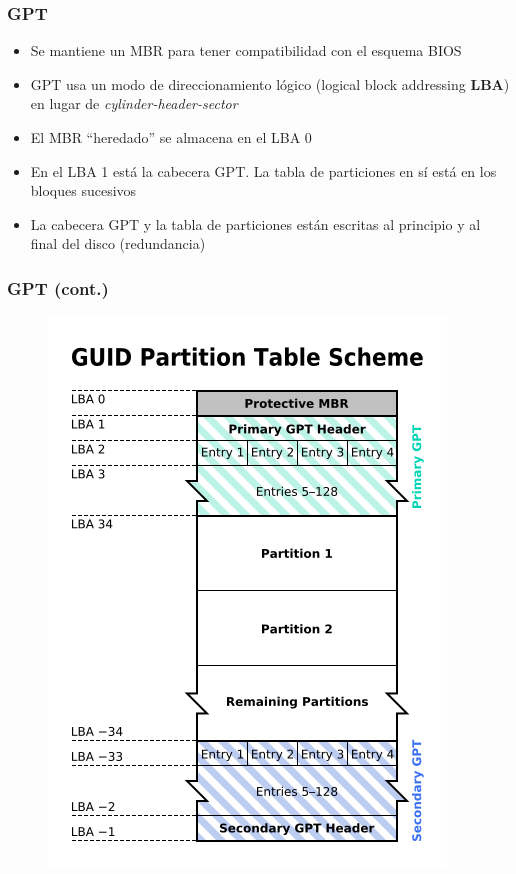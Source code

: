 \begin{frame}
	\frametitle{GPT}
	\begin{itemize}
		\item Se mantiene un MBR para tener compatibilidad con el esquema BIOS
		\item GPT usa un modo de direccionamiento lógico (logical block addressing \textbf{LBA}) en lugar de \textit{cylinder-header-sector}
		\item El MBR ``heredado'' se almacena en el LBA 0
		\item En el LBA 1 está la cabecera GPT. La tabla de particiones en sí está en los bloques sucesivos
		\item La cabecera GPT y la tabla de particiones están escritas al principio y al final del disco (redundancia)
	\end{itemize}
\end{frame}

\begin{frame}[fragile]
	\frametitle{GPT (cont.)}
	\begin{figure}
		\centering
		\includegraphics[scale=0.3]{images/gpt.png}
	\end{figure}
\end{frame}


